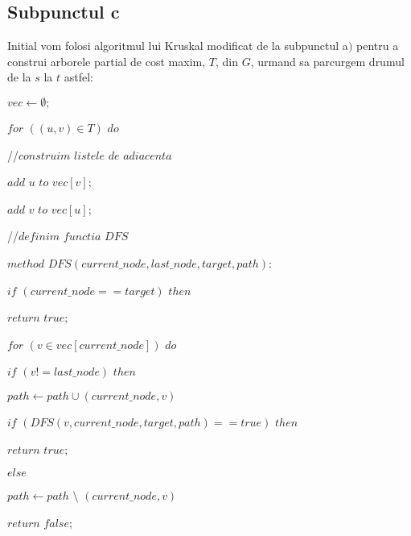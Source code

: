 \documentclass{article}
\begin{document}
{{\subsection*{\fontsize{16}{30}\selectfont Subpunctul c}
{\fontsize{14}{16}\selectfont Initial vom folosi algoritmul lui Kruskal modificat de la subpunctul a$)$ pentru a construi arborele partial de cost maxim, $T$, din $G$, urmand sa parcurgem drumul de la $s$ la $t$ astfel:
    \\
    \par $vec \leftarrow \emptyset;$ 
    \par $for$  $((u,v)\in T)$ $do$
    \par \hspace*{1cm} //$construim$  $listele$  $de$  $adiacenta$
    \par \hspace*{1cm} $add$  $u$  $to$  $vec[v];$
    \par \hspace*{1cm} $add$  $v$  $to$  $vec[u];$
    \\
    \par //$definim$  $functia$  $DFS$
    \par $method$ $DFS(current\_ node, last\_node, target, path):$
    \par \hspace*{1cm} $if$ $(current\_node == target)$ $then$
    \par \hspace*{1.5cm} $return$  $true;$
    \par \hspace*{1cm}$for$  $(v \in vec[current\_node])$  $do$
    \par \hspace*{1.5cm} $if$ $(v != last\_node)$  $then$
    \par \hspace*{2cm} $path \leftarrow path \cup (current\_node, v)$
    \par \hspace*{2cm} $if$  $(DFS(v, current\_node, target, path) == true)$ $then$
    \par \hspace*{2.5cm} $return$ $true;$ 
    \par \hspace*{2cm} $else$
    \par \hspace*{2.5cm} $path \leftarrow path$ $\setminus$ $(current\_node, v)$
    \par \hspace*{1cm} $return$ $false;$
}}}
\end{document}
